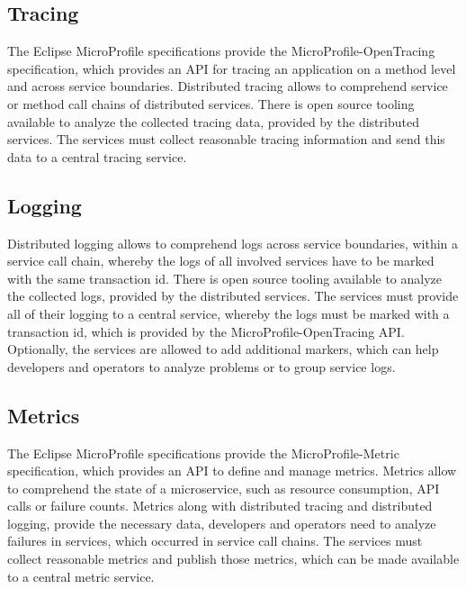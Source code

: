 \subsection{Tracing}
\label{sec:esboc-aspects-tracing}
The Eclipse MicroProfile specifications provide the MicroProfile-OpenTracing specification, which provides an API for tracing an application on a method level and across service boundaries. Distributed tracing allows to comprehend service or method call chains of distributed services. There is open source tooling available to analyze the collected tracing data, provided by the distributed services. The services must collect reasonable tracing information and send this data to a central tracing service\cite{CNCFOpentracing2018}.

\subsection{Logging}
\label{sec:esboc-aspects-logging}
Distributed logging allows to comprehend logs across service boundaries, within a service call chain, whereby the logs of all involved services have to be marked with the same transaction id. There is open source tooling available to analyze the collected logs, provided by the distributed services. The services must provide all of their logging to a central service, whereby the logs must be marked with a transaction id, which is provided by the MicroProfile-OpenTracing API. Optionally, the services are allowed to add additional markers, which can help developers and operators to analyze problems or to group service logs.

\subsection{Metrics}
\label{sec:esboc-aspects-metrics}
The Eclipse MicroProfile specifications provide the MicroProfile-Metric specification, which provides an API to define and manage metrics. Metrics allow to comprehend the state of a microservice, such as resource consumption, API calls or failure counts. Metrics along with distributed tracing and distributed logging, provide the necessary data, developers and operators need to analyze failures in services, which occurred in service call chains. The services must collect reasonable metrics and publish those metrics, which can be made available to a central metric service\cite{EclipseMicroprofileMetrics2018}.

